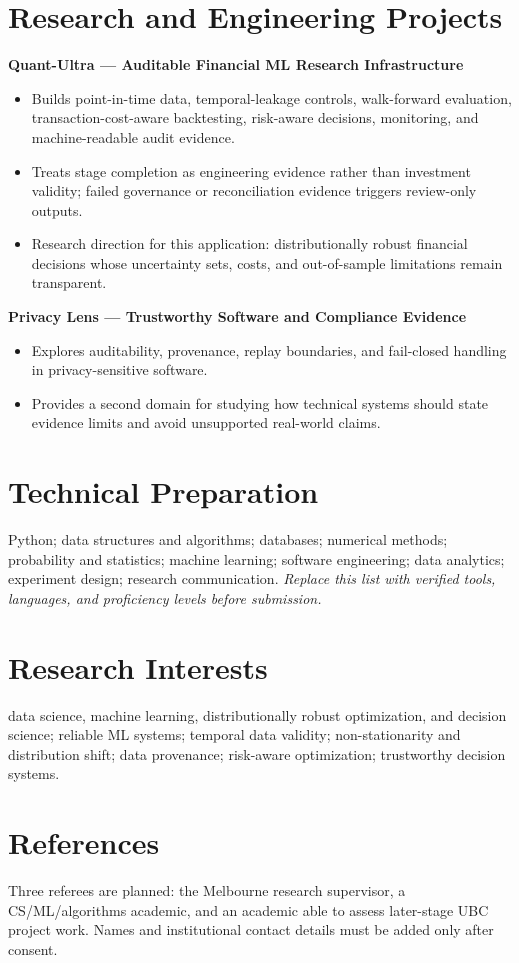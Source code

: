 \documentclass[11pt]{article}
\begin{document}
\section*{Research and Engineering Projects}
\textbf{Quant-Ultra --- Auditable Financial ML Research Infrastructure}
\begin{itemize}
\item Builds point-in-time data, temporal-leakage controls, walk-forward evaluation, transaction-cost-aware backtesting, risk-aware decisions, monitoring, and machine-readable audit evidence.
\item Treats stage completion as engineering evidence rather than investment validity; failed governance or reconciliation evidence triggers review-only outputs.
\item Research direction for this application: distributionally robust financial decisions whose uncertainty sets, costs, and out-of-sample limitations remain transparent.
\end{itemize}

\begin{samepage}
\textbf{Privacy Lens --- Trustworthy Software and Compliance Evidence}
\begin{itemize}
\item Explores auditability, provenance, replay boundaries, and fail-closed handling in privacy-sensitive software.
\item Provides a second domain for studying how technical systems should state evidence limits and avoid unsupported real-world claims.
\end{itemize}
\end{samepage}

\section*{Technical Preparation}
Python; data structures and algorithms; databases; numerical methods; probability and statistics; machine learning; software engineering; data analytics; experiment design; research communication. \textit{Replace this list with verified tools, languages, and proficiency levels before submission.}

\section*{Research Interests}
data science, machine learning, distributionally robust optimization, and decision science; reliable ML systems; temporal data validity; non-stationarity and distribution shift; data provenance; risk-aware optimization; trustworthy decision systems.

\section*{References}
Three referees are planned: the Melbourne research supervisor, a CS/ML/algorithms academic, and an academic able to assess later-stage UBC project work. Names and institutional contact details must be added only after consent.
\end{document}
